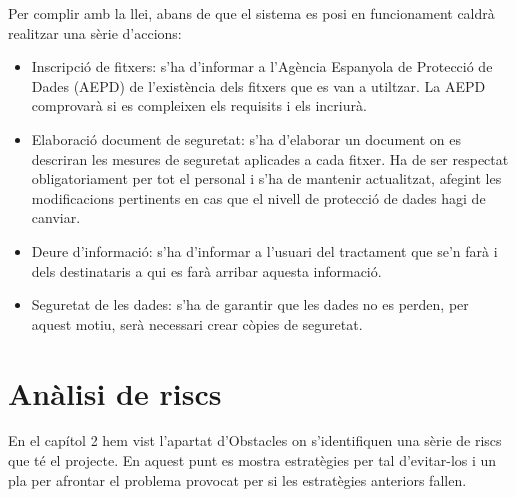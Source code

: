 Per complir amb la llei, abans de que el sistema es posi en funcionament caldrà realitzar una sèrie d’accions:
\begin{itemize}
\item{}Inscripció de fitxers: s’ha d’informar a l’Agència Espanyola de Protecció de Dades (AEPD) de l’existència dels fitxers que es van a utiltzar. La AEPD comprovarà si es compleixen els requisits i els incriurà.
\item{}Elaboració document de seguretat: s’ha d’elaborar un document on es
descriran les mesures de seguretat aplicades a cada fitxer. Ha de ser respectat obligatoriament per tot el personal i s’ha de mantenir actualitzat, afegint les modificacions pertinents en cas que el nivell de protecció de dades hagi de canviar.
\item{}Deure d’informació: s’ha d’informar a l’usuari del tractament que se’n farà i dels destinataris a qui es farà arribar aquesta informació.
\item{}Seguretat de les dades: s’ha de garantir que les dades no es perden, per aquest motiu, serà necessari crear còpies de seguretat.

\end{itemize}

\section{Anàlisi de riscs}

En el capítol 2 hem vist l’apartat d’Obstacles on s’identifiquen una sèrie de
riscs que té el projecte. En aquest punt es mostra estratègies per tal d’evitar-los
i un pla per afrontar el problema provocat per si les estratègies anteriors fallen.

